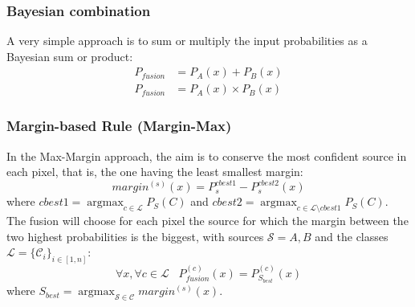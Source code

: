 \documentclass[10pt]{article}
\DeclareMathOperator{\argmax}{argmax}
\begin{document}
\subsubsection{Bayesian combination}\label{sec:bayesian}
A very simple approach is to sum or multiply the input probabilities as a Bayesian sum or product:
\begin{align}
    P_{fusion}&=P_A(x)+P_B(x)\\
    P_{fusion}&=P_A(x)\times P_B(x)
\end{align}
\subsubsection{Margin-based Rule (Margin-Max)}\label{sec:margin}
In the Max-Margin approach, the aim is to conserve the most confident source in each pixel, that is, the one having the least smallest margin:
\begin{equation}
    margin^{(s)}(x)=P_s^{cbest1}-P_s^{cbest2}(x)
\end{equation}
where $cbest1=\argmax_{c\in\mathcal{L}}P_S(C)$ and $cbest2=\argmax_{c\in\mathcal{L}\setminus cbest1}P_S(C)$. The fusion will choose for each pixel the source for which the margin between the two highest probabilities is the biggest, with sources $\mathcal{S}={A,B}$ and the classes $\mathcal{L}=\{\mathcal{C}_i\}_{i\in[1,n]}$:
\begin{equation}
    \forall x,\forall c\in \mathcal{L}\;\;\; P_{fusion}^{(c)}(x)=P_{S_{best}}^{(c)}(x)
\end{equation}
where $S_{best}=\argmax_{\mathcal{S}\in\mathcal{C}}margin^{(s)}(x)$.
\end{document}
